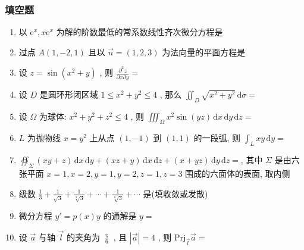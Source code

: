 \documentclass[cn,11pt,fancy,hide]{elegantbook}
\newcommand{\ee}{\mathrm{e}}
\newcommand{\dd}{\,\mathrm{d}}
\renewcommand{\leq}{\leqslant}
\begin{document}
\subsubsection{填空题}
\begin{enumerate}
	\item 以 $\ee^x,x\ee^x$ 为解的阶数最低的常系数线性齐次微分方程是\underline{\hspace{8pc}}
	
	\item 过点 $A(1,-2,1)$ 且以 $\vec{n}=(1,2,3)$ 为法向量的平面方程是\underline{\hspace{8pc}}
	
	\item 设 $z=\sin \left(x^{2}+y\right)$ , 则 $\frac{\partial^{2} z}{\partial x \partial y}=$\underline{\hspace{8pc}}
	
	\item 设 $D$ 是圆环形闭区域 $1 \leq x^{2}+y^{2} \leq 4$ , 那么 $\iint_{D} \sqrt{x^{2}+y^{2}} \dd \sigma=$\underline{\hspace{8pc}}
	
	\item 设 $\Omega$ 为球体: $x^{2}+y^{2}+z^{2} \leq 4$ , 则 $\iiint_{\Omega} x^{2} \sin (y z) \dd x \dd y \dd z=$\underline{\hspace{8pc}}
	
	\item $L$ 为抛物线 $x=y^2$ 上从点 $(1,-1)$ 到 $(1,1)$ 的一段弧, 则 $\int_{L} x y \dd y=$\underline{\hspace{8pc}}
	
	\item $\oiint_{\Sigma}(x y+z) \dd x \dd y+(x z+y) \dd x \dd z+(x+y z) \dd y \dd z=$\underline{\hspace{8pc}}, 其中 $\Sigma$ 是由六张平面 $x=1,x=2,y=1,y=2,z=1,z=3$ 围成的六面体的表面, 取内侧
	
	\item 级数 $\frac{1}{3}+\frac{1}{\sqrt{3}}+\frac{1}{\sqrt[3]{3}}+\cdots+\frac{1}{\sqrt[n]{3}}+\cdots$ 是\underline{\hspace{8pc}}(填收敛或发散)
	
	\item 微分方程 $y'=p(x) y$ 的通解是 $y=$\underline{\hspace{8pc}}
	
	\item 设 $\vec{a}$ 与轴 $\vec{l}$ 的夹角为 $\frac{\uppi}{6}$ , 且 $|\vec{a}|=4$ , 则 $\mathrm{Prj}_{\vec{l}} \vec{a}=$\underline{\hspace{8pc}}
	

\end{enumerate}
\end{document}
